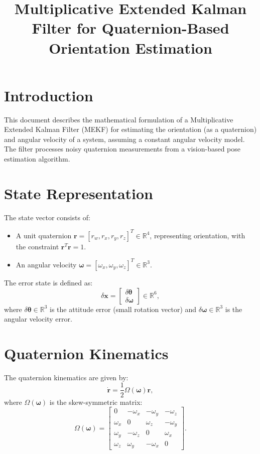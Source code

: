 \documentclass[a4paper,10pt]{article}
\begin{document}
\title{Multiplicative Extended Kalman Filter for Quaternion-Based Orientation Estimation}
\author{}
\date{}
\maketitle

\section{Introduction}
This document describes the mathematical formulation of a Multiplicative Extended Kalman Filter (MEKF) for estimating the orientation (as a quaternion) and angular velocity of a system, assuming a constant angular velocity model. The filter processes noisy quaternion measurements from a vision-based pose estimation algorithm.

\section{State Representation}
The state vector consists of:
\begin{itemize}
    \item A unit quaternion $\mathbf{r} = [r_w, r_x, r_y, r_z]^T \in \mathbb{R}^4$, representing orientation, with the constraint $\mathbf{r}^T \mathbf{r} = 1$.
    \item An angular velocity $\boldsymbol{\omega} = [\omega_x, \omega_y, \omega_z]^T \in \mathbb{R}^3$.
\end{itemize}
The error state is defined as:
\[
\delta \mathbf{x} = \begin{bmatrix} \delta \boldsymbol{\theta} \\ \delta \boldsymbol{\omega} \end{bmatrix} \in \mathbb{R}^6,
\]
where $\delta \boldsymbol{\theta} \in \mathbb{R}^3$ is the attitude error (small rotation vector) and $\delta \boldsymbol{\omega} \in \mathbb{R}^3$ is the angular velocity error.

\section{Quaternion Kinematics}
The quaternion kinematics are given by:
\[
\dot{\mathbf{r}} = \frac{1}{2} \Omega(\boldsymbol{\omega}) \mathbf{r},
\]
where $\Omega(\boldsymbol{\omega})$ is the skew-symmetric matrix:
\[
\Omega(\boldsymbol{\omega}) = \begin{bmatrix}
0 & -\omega_x & -\omega_y & -\omega_z \\
\omega_x & 0 & \omega_z & -\omega_y \\
\omega_y & -\omega_z & 0 & \omega_x \\
\omega_z & \omega_y & -\omega_x & 0
\end{bmatrix}.
\]
\end{document}
